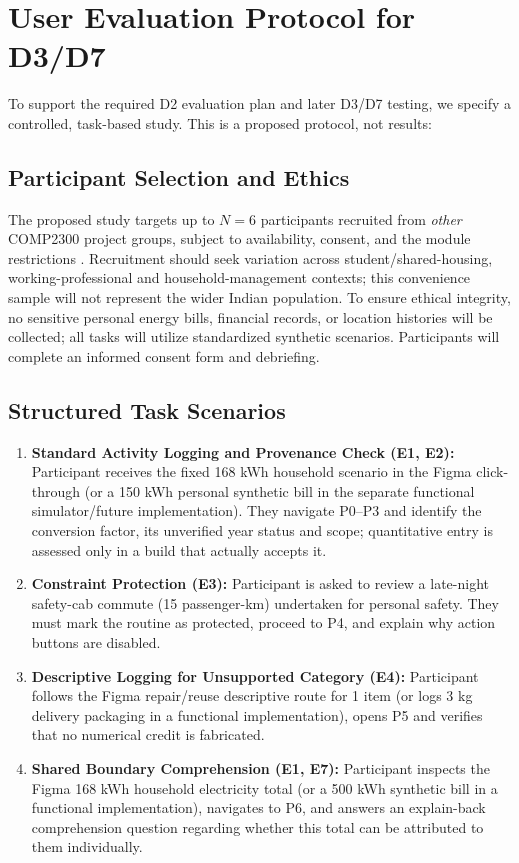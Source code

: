 \documentclass[12pt,a4paper]{article}
\begin{document}
\section{User Evaluation Protocol for D3/D7}

To support the required D2 evaluation plan and later D3/D7 testing, we specify a controlled, task-based study. This is a proposed protocol, not results:

\subsection{Participant Selection and Ethics}
The proposed study targets up to $N=6$ participants recruited from \emph{other} COMP2300 project groups, subject to availability, consent, and the module restrictions \cite{modulebrief}. Recruitment should seek variation across student/shared-housing, working-professional and household-management contexts; this convenience sample will not represent the wider Indian population. To ensure ethical integrity, no sensitive personal energy bills, financial records, or location histories will be collected; all tasks will utilize standardized synthetic scenarios. Participants will complete an informed consent form and debriefing.

\subsection{Structured Task Scenarios}
\begin{enumerate}[label=\textbf{Task \arabic*:},leftmargin=*]
  \item \textbf{Standard Activity Logging and Provenance Check (E1, E2):} Participant receives the fixed 168 kWh household scenario in the Figma click-through (or a 150 kWh personal synthetic bill in the separate functional simulator/future implementation). They navigate P0--P3 and identify the conversion factor, its unverified year status and scope; quantitative entry is assessed only in a build that actually accepts it.
  \item \textbf{Constraint Protection (E3):} Participant is asked to review a late-night safety-cab commute (15 passenger-km) undertaken for personal safety. They must mark the routine as protected, proceed to P4, and explain why action buttons are disabled.
  \item \textbf{Descriptive Logging for Unsupported Category (E4):} Participant follows the Figma repair/reuse descriptive route for 1 item (or logs 3 kg delivery packaging in a functional implementation), opens P5 and verifies that no numerical credit is fabricated.
  \item \textbf{Shared Boundary Comprehension (E1, E7):} Participant inspects the Figma 168 kWh household electricity total (or a 500 kWh synthetic bill in a functional implementation), navigates to P6, and answers an explain-back comprehension question regarding whether this total can be attributed to them individually.
\end{enumerate}
\end{document}
